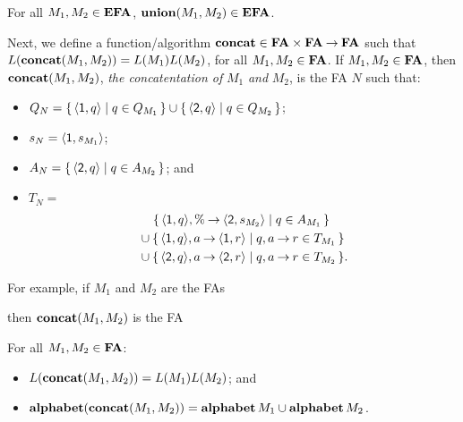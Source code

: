 \begin{proposition}
For all $M_1,M_2\in\mathbf{EFA}$, $\mathbf{union}(M_1,M_2)\in\mathbf{EFA}$.
\end{proposition}

%
%
%
Next, we define a function/algorithm $\mathbf{concat}\in\mathbf{FA}\times\mathbf{FA}\mathbin{\to}\mathbf{FA}$
such that $L(\mathbf{concat}(M_1,M_2))=L(M_1)L(M_2)$, for all
$M_1,M_2\in\mathbf{FA}$.  If $M_1,M_2\in\mathbf{FA}$, then $\mathbf{concat}(M_1,M_2)$, \emph{the
concatentation of} $M_1$ \emph{and} $M_2$, is the
FA $N$ such that:
\begin{itemize}
\item $Q_N=\{ \, \langle\mathsf{1},q\rangle \mid q\in Q_{M_1} \, \}\cup
\{ \, \langle\mathsf{2},q\rangle \mid q\in Q_{M_2} \, \}$;

\item $s_N=\langle\mathsf{1},s_{M_1}\rangle$;

\item $A_N=\{ \, \langle\mathsf{2},q\rangle \mid q\in
A_{M_2} \, \}$; and

\item $T_N={}$
  \begin{align*}
    &\quad\,
    \{ \, \langle\mathsf{1},q\rangle,\%\mathbin{\to}\langle\mathsf{2},s_{M_2}\rangle \mid q\in
      A_{M_1} \, \}
    \\
    &\cup
    \{ \, \langle\mathsf{1},q\rangle,a\mathbin{\to}\langle\mathsf{1},r\rangle \mid q,
      a\mathbin{\to} r\in T_{M_1} \, \}
    \\
    &\cup
    \{ \, \langle\mathsf{2},q\rangle,a\mathbin{\to}\langle\mathsf{2},r\rangle \mid q,
      a\mathbin{\to} r\in T_{M_2} \, \}.
  \end{align*}
\end{itemize}

For example, if $M_1$ and $M_2$ are the FAs
\begin{center}


\end{center}
then $\mathbf{concat}(M_1,M_2)$ is the FA
\begin{center}

\end{center}

\begin{proposition}
For all $M_1,M_2\in\mathbf{FA}$:
\begin{itemize}
\item $L(\mathbf{concat}(M_1,M_2))=L(M_1)L(M_2)$; and

\item $\mathbf{alphabet}(\mathbf{concat}(M_1,M_2))=\mathbf{alphabet}\,M_1\cup\mathbf{alphabet}\,M_2$.
\end{itemize}
\end{proposition}

